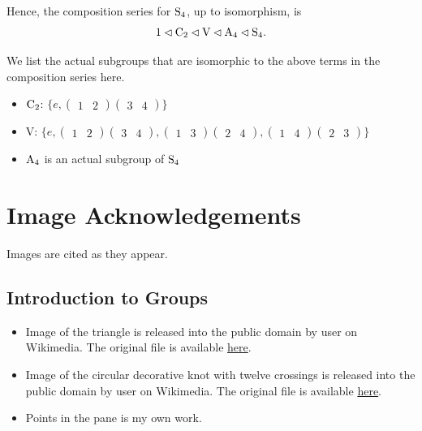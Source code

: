 \begin{enumerate}
    Hence, the composition series for $\mathrm{S}_{4}$, up to isomorphism, is
    \[
        1 \lhd \mathrm{C}_{2} \lhd \mathrm{V} \lhd \mathrm{A}_{4} \lhd \mathrm{S}_{4}.   
    \]
    \begin{remark}
        We list the actual subgroups that are isomorphic to the above terms in the composition series here.
        \begin{itemize}
            \item $\mathrm{C}_{2}$: $\{e, \begin{pmatrix}1&2\end{pmatrix}\begin{pmatrix}3&4\end{pmatrix}\}$
            \item V: $\{e, \begin{pmatrix}1&2\end{pmatrix}\begin{pmatrix}3&4\end{pmatrix}, \begin{pmatrix}1&3\end{pmatrix}\begin{pmatrix}2&4\end{pmatrix}, \begin{pmatrix}1&4\end{pmatrix}\begin{pmatrix}2&3\end{pmatrix}\}$
            \item $\mathrm{A}_{4}$ is an actual subgroup of $\mathrm{S}_{4}$
        \end{itemize}
    \end{remark}
\end{enumerate}

\chapter{Image Acknowledgements}
Images are cited as they appear.

\section{Introduction to Groups}
\begin{itemize}
    \item Image of the triangle is released into the public domain by user  on Wikimedia. The original file is available \href{https://commons.wikimedia.org/wiki/File:Labeled_Triangle_Reflections.svg}{here}.
    \item Image of the circular decorative knot with twelve crossings is released into the public domain by user  on Wikimedia. The original file is available \href{https://commons.wikimedia.org/wiki/File:Circular-cross-decorative-knot-12crossings.svg}{here}.
    \item Points in the pane is my own work.
\end{itemize}

